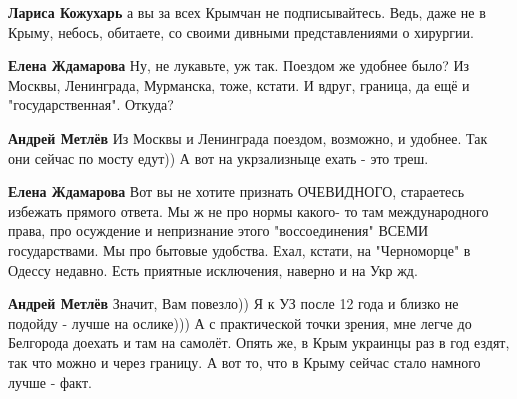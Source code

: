 \begin{itemize}
\begin{itemize}
 
\textbf{Лариса Кожухарь} а вы за всех Крымчан не подписывайтесь. Ведь, даже не
в Крыму, небось, обитаете, со своими дивными представлениями о хирургии.

 
\textbf{Елена Ждамарова} Ну, не лукавьте, уж так. Поездом же удобнее было? Из
Москвы, Ленинграда, Мурманска, тоже, кстати. И вдруг, граница, да ещё и
"государственная". Откуда?

 
\textbf{Андрей Метлёв} Из Москвы и Ленинграда поездом, возможно, и удобнее. Так
они сейчас по мосту едут)) А вот на укрзализныце ехать - это треш.

 
\textbf{Елена Ждамарова} Вот вы не хотите признать ОЧЕВИДНОГО, стараетесь
избежать прямого ответа. Мы ж не про нормы какого- то там международного права,
про осуждение и непризнание этого "воссоединения" ВСЕМИ государствами. Мы про
бытовые удобства. Ехал, кстати, на "Черноморце" в Одессу недавно. Есть приятные
исключения, наверно и на Укр жд.

 
\textbf{Андрей Метлёв} Значит, Вам повезло)) Я к УЗ после 12 года и близко не
подойду - лучше на ослике))) А с практической точки зрения, мне легче до
Белгорода доехать и там на самолёт. Опять же, в Крым украинцы раз в год ездят,
так что можно и через границу. А вот то, что в Крыму сейчас стало намного лучше
- факт.


\end{itemize}
\end{itemize}
